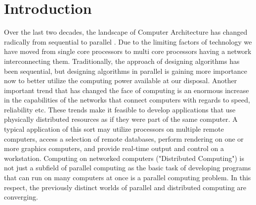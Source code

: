 \chapter{Introduction}\label{chapter:introduction}
Over the last two decades, the landscape of Computer Architecture has changed radically from sequential to parallel . Due to the limiting factors of technology we have moved from single core processors to multi core processors having a network interconnecting them. Traditionally, the approach of designing algorithms has been sequential, but designing algorithms in parallel is gaining more importance now to better utilize the computing power available at our disposal. Another important trend that has changed the face of computing is an enormous increase in the capabilities of the networks that connect computers with regards to speed, reliability etc. These trends make it feasible to develop applications that use physically distributed resources as if they were part of the same computer. A typical application of this sort may utilize processors on multiple remote computers, access a selection of remote databases, perform rendering on one or more graphics computers, and provide real-time output and control on a workstation. Computing on networked computers ("Distributed Computing") is not just a subfield of parallel computing as the basic task of developing programs that can run on many computers at once is a parallel computing problem. In this respect, the previously distinct worlds of parallel and distributed computing are converging.\\ \par
\noindent
